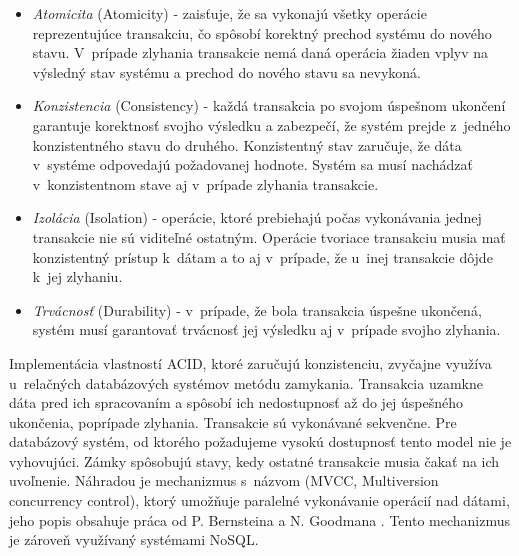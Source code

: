\documentclass[11pt,twoside,a4paper]{book}
\begin{document}
\begin{itemize}
  \item \emph{Atomicita} (Atomicity) - zaisťuje, že sa vykonajú všetky operácie reprezentujúce transakciu, čo spôsobí korektný prechod systému do nového stavu. V~prípade zlyhania transakcie nemá daná operácia žiaden vplyv na výsledný stav systému a prechod do nového stavu sa nevykoná.
  \item \emph{Konzistencia} (Consistency) - každá transakcia po svojom úspešnom ukončení garantuje korektnosť svojho výsledku a zabezpečí, že systém prejde z~jedného konzistentného stavu do druhého. Konzistentný stav zaručuje, že dáta v~systéme odpovedajú požadovanej hodnote. Systém sa musí nachádzať v~konzistentnom stave aj v~prípade zlyhania transakcie.
  \item \emph{Izolácia} (Isolation) - operácie, ktoré prebiehajú počas vykonávania jednej transakcie nie sú viditeľné ostatným. Operácie tvoriace transakciu musia mať konzistentný prístup k~dátam a to aj v~prípade, že u~inej transakcie dôjde k~jej zlyhaniu.
  \item \emph{Trvácnosť} (Durability) - v~prípade, že bola transakcia úspešne ukončená, systém musí garantovať trvácnosť jej výsledku aj v~prípade svojho zlyhania.
\end{itemize}
Implementácia vlastností ACID, ktoré zaručujú konzistenciu, zvyčajne využíva u~relačných databázových systémov metódu zamykania. Transakcia uzamkne dáta pred ich spracovaním a spôsobí ich nedostupnosť až do jej úspešného ukončenia, poprípade zlyhania. Transakcie sú vykonávané sekvenčne. Pre databázový systém, od ktorého požadujeme vysokú dostupnosť tento model nie je vyhovujúci. Zámky spôsobujú stavy, kedy ostatné transakcie musia čakať na ich uvoľnenie. Náhradou je mechanizmus s~názvom  (MVCC, Multiversion concurrency control), ktorý umožňuje paralelné vykonávanie operácií nad dátami, jeho popis obsahuje práca od P. Bernsteina a N. Goodmana \cite{bernstein1981concurrency}. Tento mechanizmus je zároveň využívaný systémami NoSQL.
\end{document}

